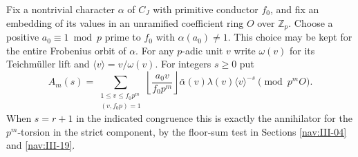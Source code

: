 \documentclass[a4paper,11pt]{article}
\theoremstyle{definition}
\theoremstyle{remark}
\newcommand{\ZZ}{\mathbb Z}\newcommand{\ord}{\operatorname{ord}}
\numberwithin{equation}{section}
\begin{document}
Fix a nontrivial character \(\alpha\) of \(C_J\) with primitive
conductor \(f_0\), and fix an embedding of its values in an
unramified coefficient ring \(O\) over \(\ZZ_p\). Choose a
positive \(a_0\equiv1\bmod p\) prime to \(f_0\) with
\(\alpha(a_0)\ne1\). This choice may be kept for the entire
Frobenius orbit of \(\alpha\). For any \(p\)-adic unit \(v\)
write \(\omega(v)\) for its Teichm\"uller lift and
\(\langle v\rangle=v/\omega(v)\). For integers \(s\ge0\) put
\begin{equation}
 A_m(s)=\sum_{\substack{1\le v\le f_0p^m\\(v,f_0p)=1}}
 \left\lfloor\frac{a_0 v}{f_0p^m}\right\rfloor
      \bar\alpha(v)\lambda(v)\langle v\rangle^{-s}
                     \pmod{p^mO}.                         \label{eq:As140}
\end{equation}
When \(s=r+1\) in the indicated congruence this is exactly the
annihilator for the \(p^m\)-torsion in the strict component,
by the floor-sum test in
Sections \ref{nav:III-04} and \ref{nav:III-19}.
\end{document}
